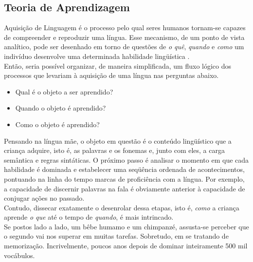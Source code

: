 \subsection{Teoria de Aprendizagem}

Aquisição de Linguagem é o processo pelo qual seres humanos tornam-se capazes de compreender e reproduzir uma língua. Esse mecanismo, de um ponto de vista analítico, pode ser desenhado em torno de questões de \emph{o quê}, \emph{quando} e \emph{como} um indivíduo desenvolve uma determinada habilidade lingüística \citep{pearl2010}.\\

Então, seria possível organizar, de maneira simplificada, um fluxo lógico dos processos que levariam à aquisição de uma língua nas perguntas abaixo.

\begin{itemize}
\item Qual é o objeto a ser aprendido?
\item Quando o objeto é aprendido?
\item Como o objeto é aprendido?
\end{itemize}

Pensando na língua mãe, o objeto em questão é o conteúdo lingüístico que a criança adquire, isto é, as palavras e os fonemas e, junto com eles, a carga semântica e regras sintáticas. O próximo passo é analisar o momento em que cada habilidade é dominada e estabelecer uma seqüência ordenada de acontecimentos, pontuando na linha do tempo marcas de proficiência com a língua. Por exemplo, a capacidade de discernir palavras na fala é obviamente anterior à capacidade de conjugar ações no passado.\\

Contudo, dissecar exatamente o desenrolar dessa etapas, isto é, \emph{como} a criança aprende \emph{o que} até o tempo de \emph{quando}, é mais intrincado.\\

Se postos lado a lado, um bêbe humamo e um chimpanzé, assusta-se perceber que o segundo vai nos superar em muitas tarefas. Sobretudo, em se tratando de memorização. Incrivelmente, poucos anos depois de dominar inteiramente 500 mil vocábulos.





